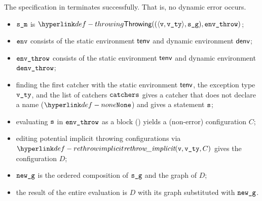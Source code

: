 
The specification in  terminates successfully.
That is, no dynamic error occurs.

\ProseParagraph
\AllApply
\begin{itemize}
  \item $\sm$ is $\Throwing((\langle \vv, \vvty \rangle, \sg), \envthrow)$;
  \item $\env$ consists of the static environment $\tenv$ and dynamic environment $\denv$;
  \item $\envthrow$ consists of the static environment $\tenv$ and dynamic environment \\ $\denvthrow$;
  \item finding the first catcher with the static environment $\tenv$, the exception type $\vvty$,
  and the list of catchers $\catchers$ gives a catcher that does not declare a name ($\None$) and gives a statement $\vs$;
  \item evaluating $\vs$ in $\envthrow$ as a block () yields a (non-error)
        configuration $C$\ProseOrError;
  \item editing potential implicit throwing configurations via $\rethrowimplicit(\vv, \vvty, C)$
        gives the configuration $D$;
  \item $\newg$ is the ordered composition of $\sg$ and the graph of $D$;
  \item the result of the entire evaluation is $D$ with its graph substituted with $\newg$.
\end{itemize}

\FormallyParagraph
\begin{mathpar}
\end{mathpar}

